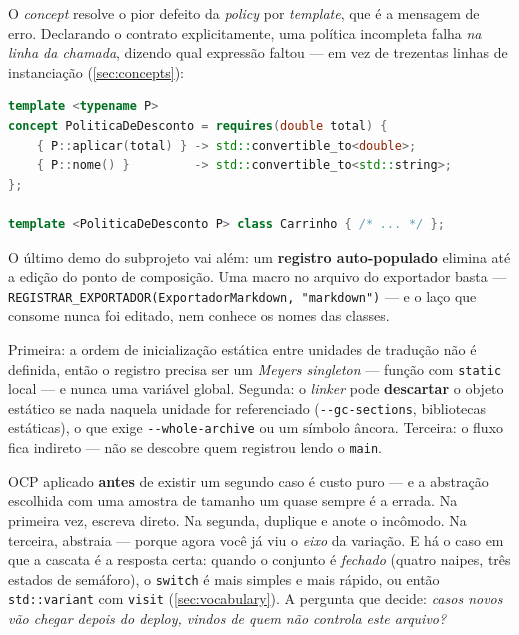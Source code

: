 O \emph{concept} resolve o pior defeito da \emph{policy} por \emph{template}, que
é a mensagem de erro. Declarando o contrato explicitamente, uma política
incompleta falha \emph{na linha da chamada}, dizendo qual expressão faltou ---
em vez de trezentas linhas de instanciação (\cref{sec:concepts}):

\begin{lstlisting}[style=bt, language=C++,
    caption={O contrato da política, escrito como \emph{concept}.}]
template <typename P>
concept PoliticaDeDesconto = requires(double total) {
    { P::aplicar(total) } -> std::convertible_to<double>;
    { P::nome() }         -> std::convertible_to<std::string>;
};

template <PoliticaDeDesconto P> class Carrinho { /* ... */ };
\end{lstlisting}

O último demo do subprojeto vai além: um \textbf{registro auto-populado} elimina
até a edição do ponto de composição. Uma macro no arquivo do exportador basta
--- \texttt{REGISTRAR\_EXPORTADOR(ExportadorMarkdown, "markdown")} --- e o laço
que consome nunca foi editado, nem conhece os nomes das classes.

\begin{armadilha}
Primeira: a ordem de inicialização estática entre unidades de tradução não é
definida, então o registro precisa ser um \emph{Meyers singleton} --- função com
\texttt{static} local --- e nunca uma variável global. Segunda: o \emph{linker}
pode \textbf{descartar} o objeto estático se nada naquela unidade for
referenciado (\texttt{-{}-gc-sections}, bibliotecas estáticas), o que exige
\texttt{-{}-whole-archive} ou um símbolo âncora. Terceira: o fluxo fica indireto
--- não se descobre quem registrou lendo o \texttt{main}.
\end{armadilha}

\begin{regra}
OCP aplicado \textbf{antes} de existir um segundo caso é custo puro --- e a
abstração escolhida com uma amostra de tamanho um quase sempre é a errada. Na
primeira vez, escreva direto. Na segunda, duplique e anote o incômodo. Na
terceira, abstraia --- porque agora você já viu o \emph{eixo} da variação.
E há o caso em que a cascata é a resposta certa: quando o conjunto é
\emph{fechado} (quatro naipes, três estados de semáforo), o \texttt{switch} é
mais simples e mais rápido, ou então \texttt{std::variant} com \texttt{visit}
(\cref{sec:vocabulary}). A pergunta que decide: \emph{casos novos vão chegar
depois do \emph{deploy}, vindos de quem não controla este arquivo?}
\end{regra}


